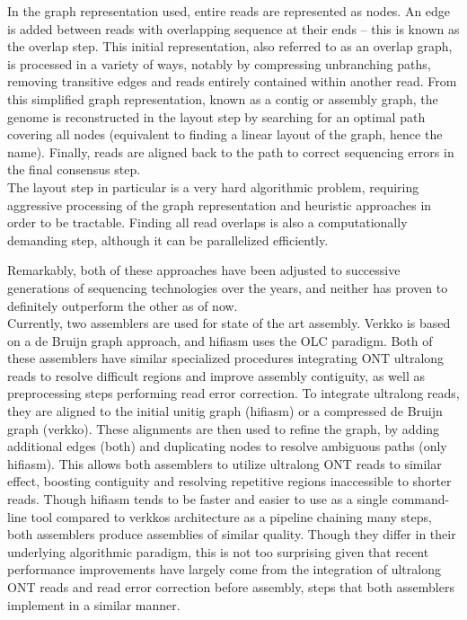 In the graph representation used, entire reads are represented as nodes.
An edge is added between reads with overlapping sequence at their ends -- this is known as the overlap step.
This initial representation, also referred to as an overlap graph, is processed in a variety of ways, notably by compressing unbranching paths, removing transitive edges and reads entirely contained within another read.
From this simplified graph representation, known as a contig or assembly graph, the genome is reconstructed in the layout step by searching for an optimal path covering all nodes (equivalent to finding a linear layout of the graph, hence the name).
Finally, reads are aligned back to the path to correct sequencing errors in the final consensus step.\\
The layout step in particular is a very hard algorithmic problem, requiring aggressive processing of the graph representation and heuristic approaches in order to be tractable.
Finding all read overlaps is also a computationally demanding step, although it can be parallelized efficiently.

Remarkably, both of these approaches have been adjusted to successive generations of sequencing technologies over the years, and neither has proven to definitely outperform the other as of now.\\
Currently, two assemblers are used for state of the art assembly.
Verkko is based on a de Bruijn graph approach, and hifiasm uses the OLC paradigm\cite{rautiainen23, cheng21}.
Both of these assemblers have similar specialized procedures integrating ONT ultralong reads to resolve difficult regions and improve assembly contiguity, as well as preprocessing steps performing read error correction\cite{cheng24, antipov25}.
To integrate ultralong reads, they are aligned to the initial unitig graph (hifiasm) or a compressed de Bruijn graph (verkko).
These alignments are then used to refine the graph, by adding additional edges (both) and duplicating nodes to resolve ambiguous paths (only hifiasm).
This allows both assemblers to utilize ultralong ONT reads to similar effect, boosting contiguity and resolving repetitive regions inaccessible to shorter reads.
Though hifiasm tends to be faster and easier to use as a single command-line tool compared to verkkos architecture as a pipeline chaining many steps, both assemblers produce assemblies of similar quality.
Though they differ in their underlying algorithmic paradigm, this is not too surprising given that recent performance improvements have largely come from the integration of ultralong ONT reads and read error correction before assembly, steps that both assemblers implement in a similar manner.

